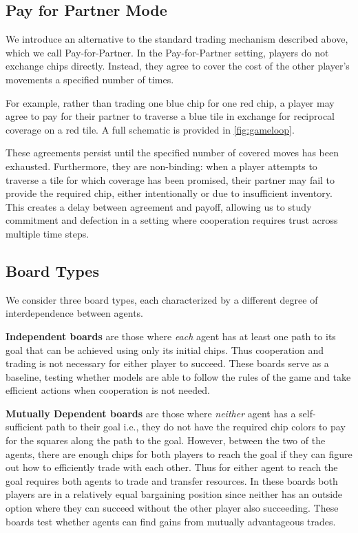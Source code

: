 \documentclass{article} %
\newcommand{\PforP}{Pay-for-Partner\xspace}
\begin{document}
\subsection{Pay for Partner Mode}
\label{sec:p4p}

We introduce an alternative to the standard trading mechanism described above, which we call \PforP. In the \PforP setting, players do not exchange chips directly. Instead, they agree to cover the cost of the other player’s movements a specified number of times.

For example, rather than trading one blue chip for one red chip, a player may agree to pay for their partner to traverse a blue tile in exchange for reciprocal coverage on a red tile. A full schematic is provided in \cref{fig:gameloop}.

These agreements persist until the specified number of covered moves has been exhausted. Furthermore, they are non-binding: when a player attempts to traverse a tile for which coverage has been promised, their partner may fail to provide the required chip, either intentionally or due to insufficient inventory. This creates a delay between agreement and payoff, allowing us to study commitment and defection in a setting where cooperation requires trust across multiple time steps.

\subsection{Board Types}
We consider three board types, each characterized by a different degree of interdependence between agents. 

\textbf{Independent boards} are those where \textit{each} agent has at least one path to its goal that can be achieved using only its initial chips. Thus cooperation and trading is not necessary for either player to succeed. These boards serve as a baseline, testing whether models are able to follow the rules of the game and take efficient actions when cooperation is not needed. 

\textbf{Mutually Dependent boards} are those where \textit{neither} agent has a self-sufficient path to their goal i.e., they do not have the required chip colors to pay for the squares along the path to the goal. However, between the two of the agents, there are enough chips for both players to reach the goal if they can figure out how to efficiently trade with each other. Thus for either agent to reach the goal requires both agents to trade and transfer resources. In these boards both players are in a relatively equal bargaining position since neither has an outside option where they can succeed without the other player also succeeding. These boards test whether agents can find gains from mutually advantageous trades. 
\end{document}
